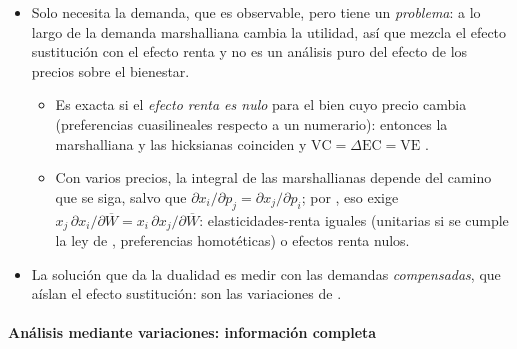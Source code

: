 \documentclass[11pt]{article}
\begin{document}
\begin{itemize}
\item Solo necesita la demanda, que es observable, pero tiene un \emph{problema}: a lo largo de la demanda marshalliana cambia la utilidad, así que mezcla el efecto sustitución con el efecto renta y no es un análisis puro del efecto de los precios sobre el bienestar.
  \begin{itemize}
  \item Es exacta si el \emph{efecto renta es nulo} para el bien cuyo precio cambia (preferencias cuasilineales respecto a un numerario): entonces la marshalliana y las hicksianas coinciden y $\mathrm{VC}=\Delta\mathrm{EC}=\mathrm{VE}$ .
  \item Con varios precios, la integral de las marshallianas depende del camino que se siga, salvo que $\partial x_i/\partial p_j=\partial x_j/\partial p_i$; por , eso exige $x_j\,\partial x_i/\partial\overline{W}=x_i\,\partial x_j/\partial\overline{W}$: elasticidades-renta iguales (unitarias si se cumple la ley de , preferencias homotéticas) o efectos renta nulos.
  \end{itemize}
\item La solución que da la dualidad es medir con las demandas \emph{compensadas}, que aíslan el efecto sustitución: son las variaciones de .
\end{itemize}

\paragraph{Análisis mediante variaciones: información completa}
\end{document}

